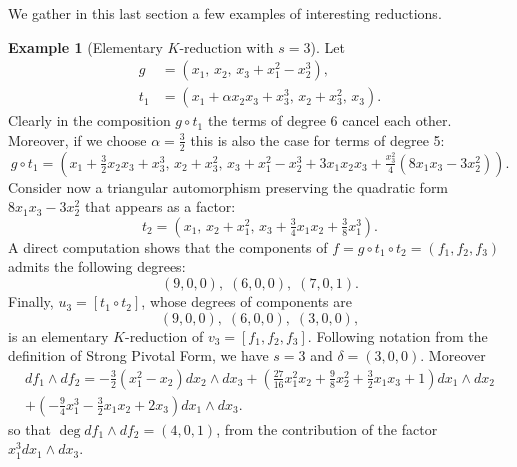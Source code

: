 \documentclass[reqno,oneside,11pt]{amsart}
\theoremstyle{plain}
\theoremstyle{definition}
\newtheorem{example}[theorem]{Example}
\begin{document}
We gather in this last section a few examples of interesting reductions.

\begin{example}[Elementary $K$-reduction with $s = 3$] \label{exple:s=3}
Let
\begin{align*}
g &= (x_1,\, x_2,\, x_3 + x_1^2 - x_2^3), \\
t_1 &= (x_1 + \alpha x_2 x_3 + x_3^3,\, x_2 + x_3^2,\, x_3).
\end{align*}
Clearly in the composition $g \circ t_1$ the terms of degree 6 cancel each other.
Moreover, if we choose $\alpha = \tfrac{3}{2}$ this is also the case for terms of degree 5:
$$g \circ t_1 = \left(x_1 + \tfrac{3}{2} x_2 x_3 + x_3^3,\, x_2 + x_3^2,\,
x_3 + x_1^2 - x_2^3 + 3x_1x_2x_3 + \tfrac{x_3^2}4(8x_1x_3-3x_2^2) \right).$$
Consider now a triangular automorphism preserving the quadratic form $8x_1x_3-3x_2^2$ that appears as a factor:
$$ t_2 = (x_1,\, x_2 + x_1^2,\, x_3 + \tfrac34 x_1x_2 + \tfrac{3}{8} x_1^3).$$
A direct computation shows that the components of $f = g \circ t_1 \circ t_2 = (f_1,f_2,f_3)$ admits the following degrees:
$$(9,0,0), \; (6,0,0), \; (7,0,1).$$
Finally, $u_3 = [t_1 \circ t_2]$, whose degrees of components are
$$(9,0,0), \; (6,0,0), \; (3,0,0),$$
is an elementary $K$-reduction of $v_3 = [f_1,f_2,f_3]$.
Following notation from the definition of Strong Pivotal Form, we have $s = 3$ and $\delta = (3,0,0)$.
Moreover
\begin{multline*}
df_1 \wedge df_2 = -\tfrac32 (x_1^2 - x_2)dx_2 \wedge dx_3 + (\tfrac{27}{16}x_1^2x_2 + \tfrac98 x_2^2 + \tfrac32 x_1 x_3 + 1)dx_1 \wedge dx_2 \\
+ (-\tfrac94 x_1^3 - \tfrac32 x_1 x_2 + 2x_3) dx_1 \wedge dx_3.
\end{multline*}
so that $\deg df_1 \wedge df_2 = (4,0,1)$, from the contribution of the factor $x_1^3 dx_1 \wedge dx_3$.

\end{example}
\end{document}
